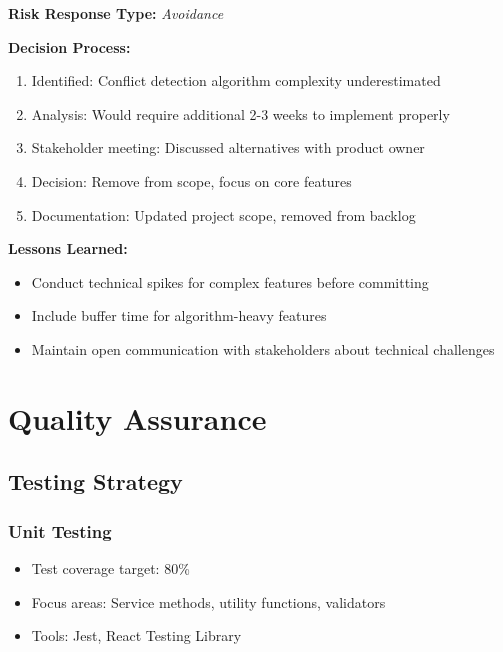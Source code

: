 \documentclass[12pt,a4paper]{article}
\begin{document}
\textbf{Risk Response Type:} \textit{Avoidance}

\textbf{Decision Process:}
\begin{enumerate}[noitemsep]
    \item Identified: Conflict detection algorithm complexity underestimated
    \item Analysis: Would require additional 2-3 weeks to implement properly
    \item Stakeholder meeting: Discussed alternatives with product owner
    \item Decision: Remove from scope, focus on core features
    \item Documentation: Updated project scope, removed from backlog
\end{enumerate}

\textbf{Lessons Learned:}
\begin{itemize}[noitemsep]
    \item Conduct technical spikes for complex features before committing
    \item Include buffer time for algorithm-heavy features
    \item Maintain open communication with stakeholders about technical challenges
\end{itemize}

\section{Quality Assurance}

\subsection{Testing Strategy}

\subsubsection{Unit Testing}
\begin{itemize}[noitemsep]
    \item Test coverage target: 80\%
    \item Focus areas: Service methods, utility functions, validators
    \item Tools: Jest, React Testing Library
\end{itemize}
\end{document}
